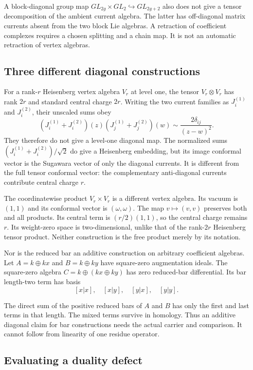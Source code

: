 A block-diagonal group map $GL_{2g}\times GL_2 \hookrightarrow GL_{2g+2}$
also does not give a tensor decomposition of the ambient current algebra.
The latter has off-diagonal matrix currents absent from the two block Lie
algebras. A retraction of coefficient complexes requires a chosen splitting
and a chain map. It is not an automatic retraction of vertex algebras.

\subsection{Three different diagonal constructions}

For a rank-$r$ Heisenberg vertex algebra $V_r$ at level one, the tensor
$V_r\otimes V_r$ has rank $2r$ and standard central charge $2r$. Writing the
two current families as $J_i^{(1)}$ and $J_i^{(2)}$, their unscaled sums
obey
\[
 (J_i^{(1)}+J_i^{(2)})(z)
 (J_j^{(1)}+J_j^{(2)})(w)
       \sim\frac{2\delta_{ij}}{(z-w)^2}.
\]
They therefore do not give a level-one diagonal map. The normalized sums
$(J_i^{(1)}+J_i^{(2)})/\sqrt2$ do give a Heisenberg embedding, but its image
conformal vector is the Sugawara vector of only the diagonal currents. It is
different from the full tensor conformal vector: the complementary
anti-diagonal currents contribute central charge $r$.

The coordinatewise product $V_r\times V_r$ is a different vertex algebra.
Its vacuum is $(1,1)$ and its conformal vector is $(\omega,\omega)$. The map
$v\mapsto(v,v)$ preserves both and all products. Its central term is
$(r/2)(1,1)$, so the central charge remains $r$. Its weight-zero space is
two-dimensional, unlike that of the rank-$2r$ Heisenberg tensor product.
Neither construction is the free product merely by its notation.

Nor is the reduced bar an additive construction on arbitrary coefficient
algebras. Let $A=k\oplus kx$ and $B=k\oplus ky$ have square-zero
augmentation ideals. The square-zero algebra $C=k\oplus(kx\oplus ky)$ has
zero reduced-bar differential. Its bar length-two term has basis
\[
 [x|x],\quad[x|y],\quad[y|x],\quad[y|y].
\]

The direct sum of the positive reduced bars of $A$ and $B$ has only the
first and last terms in that length. The mixed terms survive in homology.
Thus an additive diagonal claim for bar constructions needs the actual
carrier and comparison. It cannot follow from linearity of one residue
operator.

\subsection{Evaluating a duality defect}

